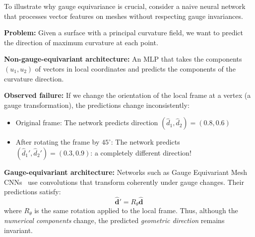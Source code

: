 \begin{example}\label{ex:impacto_gauge_predicciones}
To illustrate why gauge equivariance is crucial, consider a naive neural network that processes vector features on meshes without respecting gauge invariances.

\textbf{Problem:} Given a surface with a principal curvature field, we want to predict the direction of maximum curvature at each point.

\textbf{Non-gauge-equivariant architecture:} An \gls{MLP} that takes the components $(u_1, u_2)$ of vectors in local coordinates and predicts the components of the curvature direction.

\textbf{Observed failure:} If we change the orientation of the local frame at a vertex (a gauge transformation), the predictions change inconsistently:
\begin{itemize}
    \item Original frame: The network predicts direction $(\hat{d}_1, \hat{d}_2) = (0.8, 0.6)$
    \item After rotating the frame by $45^\circ$: The network predicts $(\hat{d}_1', \hat{d}_2') = (0.3, 0.9)$: a completely different direction!
\end{itemize}

\textbf{Gauge-equivariant architecture:} Networks such as Gauge Equivariant Mesh CNNs~\citep{cohen2019gaugeequivariantconvolutional} use convolutions that transform coherently under gauge changes. Their predictions satisfy:
\begin{equation}
\hat{\mathbf{d}}' = R_\theta \hat{\mathbf{d}}
\end{equation}
where $R_\theta$ is the same rotation applied to the local frame. Thus, although the \textit{numerical components} change, the predicted \textit{geometric direction} remains invariant.
\end{example}

